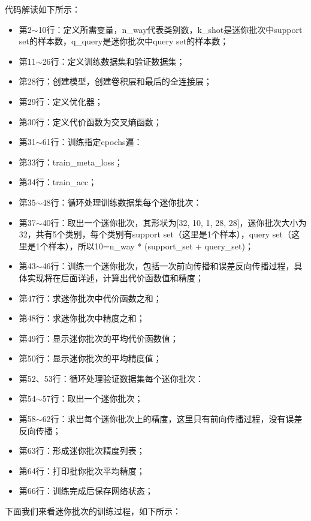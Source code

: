 代码解读如下所示：
\begin{itemize}
\item 第2$\sim$10行：定义所需变量，n\_way代表类别数，k\_shot是迷你批次中support set的样本数，q\_query是迷你批次中query set的样本数；
\item 第11$\sim$26行：定义训练数据集和验证数据集；
\item 第28行：创建模型，创建卷积层和最后的全连接层；
\item 第29行：定义优化器；
\item 第30行：定义代价函数为交叉熵函数；
\item 第31$\sim$61行：训练指定epochs遍：
\item 第33行：train\_meta\_loss；
\item 第34行：train\_acc；
\item 第35$\sim$48行：循环处理训练数据集每个迷你批次：
\item 第37$\sim$40行：取出一个迷你批次，其形状为[32, 10, 1, 28, 28]，迷你批次大小为32，共有5个类别，每个类别有support set（这里是1个样本），query set（这里是1个样本），所以10=n\_way * (support\_set + query\_set)；
\item 第43$\sim$46行：训练一个迷你批次，包括一次前向传播和误差反向传播过程，具体实现将在后面详述，计算出代价函数值和精度；
\item 第47行：求迷你批次中代价函数之和；
\item 第48行：求迷你批次中精度之和；
\item 第49行：显示迷你批次的平均代价函数值；
\item 第50行：显示迷你批次的平均精度值；
\item 第52、53行：循环处理验证数据集每个迷你批次：
\item 第54$\sim$57行：取出一个迷你批次；
\item 第58$\sim$62行：求出每个迷你批次上的精度，这里只有前向传播过程，没有误差反向传播；
\item 第63行：形成迷你批次精度列表；
\item 第64行：打印批你批次平均精度；
\item 第66行：训练完成后保存网络状态；
\end{itemize}
下面我们来看迷你批次的训练过程，如下所示：
